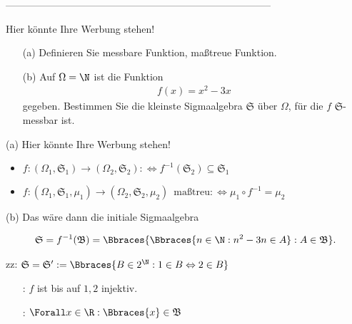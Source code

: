 --------------------------------------------------------------------------------

\begin{exercise}

Hier könnte Ihre Werbung stehen!

\begin{itemize}
  \item[(a)] Definieren Sie messbare Funktion, maßtreue Funktion.
  \item[(b)] Auf $\Omega = \N$ ist die Funktion
  \begin{align*}
    f(x) = x^2 - 3x
  \end{align*}
  gegeben. Bestimmen Sie die kleinste Sigmaalgebra $\mathfrak{S}$ über $\Omega$, für die $f$ $\mathfrak{S}$-messbar ist.
\end{itemize}

\end{exercise}

\begin{solution}

(a) Hier könnte Ihre Werbung stehen!

\begin{itemize}

  \item $f: (\Omega_1, \mathfrak{S}_1) \to (\Omega_2, \mathfrak{S}_2) : \Leftrightarrow f^{-1}(\mathfrak{S}_2) \subseteq \mathfrak{S}_1$

  \item $f: (\Omega_1, \mathfrak{S}_1, \mu_1) \to (\Omega_2, \mathfrak{S}_2, \mu_2) \enspace \text{maßtreu} : \Leftrightarrow \mu_1 \circ f^{-1} = \mu_2$

\end{itemize}

(b) Das wäre dann die initiale Sigmaalgebra

\begin{align*}
  \mathfrak{S}
  =
  f^{-1}(\mathfrak{B})
  =
  \Bbraces{\Bbraces{n \in \N: n^2 - 3n \in A}: A \in \mathfrak{B}}.
\end{align*}

zz: $\mathfrak{S} = \mathfrak{S}^\prime := \Bbraces{B \in 2^\N: 1 \in B \Leftrightarrow 2 \in B}$

\begin{itemize}

  \item[\Quote{$\subseteq$}:] $f$ ist bis auf $1, 2$ injektiv.

  \item[\Quote{$\supseteq$}:] $\Forall x \in \R: \Bbraces{x} \in \mathfrak{B}$

\end{itemize}

\end{solution}

